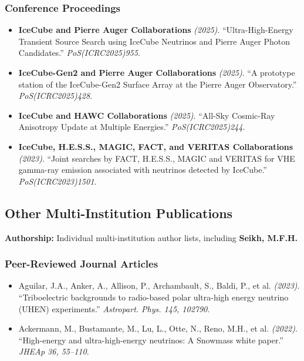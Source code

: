 \subsubsection{Conference Proceedings}
\begin{itemize}
\item \textbf{IceCube and Pierre Auger Collaborations} \textit{(2025)}. ``Ultra-High-Energy Transient Source Search using IceCube Neutrinos and Pierre Auger Photon Candidates.'' \textit{PoS(ICRC2025)955}.  
\item \textbf{IceCube-Gen2 and Pierre Auger Collaborations} \textit{(2025)}. ``A prototype station of the IceCube-Gen2 Surface Array at the Pierre Auger Observatory.'' \textit{PoS(ICRC2025)428}.  
\item \textbf{IceCube and HAWC Collaborations} \textit{(2025)}. ``All-Sky Cosmic-Ray Anisotropy Update at Multiple Energies.'' \textit{PoS(ICRC2025)244}.  
\item \textbf{IceCube, H.E.S.S., MAGIC, FACT, and VERITAS Collaborations} \textit{(2023)}. ``Joint searches by FACT, H.E.S.S., MAGIC and VERITAS for VHE gamma-ray emission associated with neutrinos detected by IceCube.'' \textit{PoS(ICRC2023)1501}.  
\end{itemize}
\medskip

\subsection{Other Multi-Institution Publications}
\textbf{Authorship:} Individual multi-institution author lists, including \textbf{Seikh, M.F.H.}
\subsubsection{Peer-Reviewed Journal Articles}
\begin{itemize}
\item Aguilar, J.A., Anker, A., Allison, P., Archambault, S., Baldi, P., et al. \textit{(2023)}. ``Triboelectric backgrounds to radio-based polar ultra-high energy neutrino (UHEN) experiments.'' \textit{Astropart. Phys. 145, 102790}.  
\item Ackermann, M., Bustamante, M., Lu, L., Otte, N., Reno, M.H., et al. \textit{(2022)}. ``High-energy and ultra-high-energy neutrinos: A Snowmass white paper.'' \textit{JHEAp 36, 55--110}.  
\end{itemize}
\endgroup
